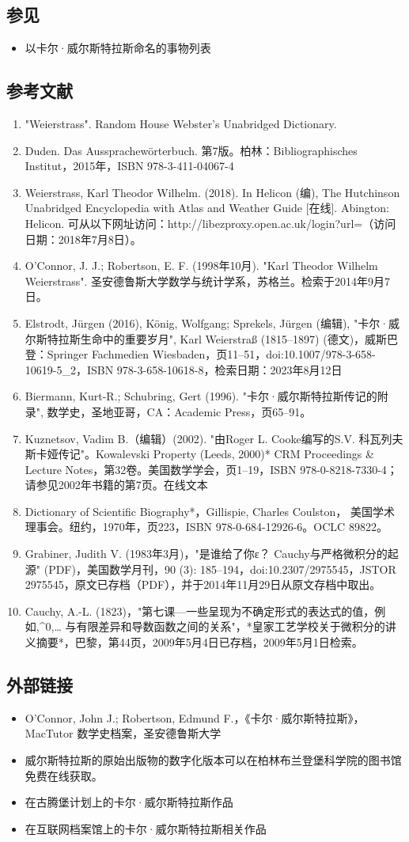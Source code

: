 \subsection{参见}  
\begin{itemize}
\item 以卡尔·威尔斯特拉斯命名的事物列表
\end{itemize}
\subsection{参考文献}  
\begin{enumerate}
\item "Weierstrass". Random House Webster's Unabridged Dictionary.  
\item Duden. Das Aussprachewörterbuch. 第7版。柏林：Bibliographisches Institut，2015年，ISBN 978-3-411-04067-4  
\item Weierstrass, Karl Theodor Wilhelm. (2018). In Helicon (编), The Hutchinson Unabridged Encyclopedia with Atlas and Weather Guide [在线]. Abington: Helicon. 可从以下网址访问：http://libezproxy.open.ac.uk/login?url=（访问日期：2018年7月8日）。  
\item O'Connor, J. J.; Robertson, E. F. (1998年10月). "Karl Theodor Wilhelm Weierstrass". 圣安德鲁斯大学数学与统计学系，苏格兰。检索于2014年9月7日。  
\item Elstrodt, Jürgen (2016), König, Wolfgang; Sprekels, Jürgen (编辑), "卡尔·威尔斯特拉斯生命中的重要岁月", Karl Weierstraß (1815–1897) (德文)，威斯巴登：Springer Fachmedien Wiesbaden，页11–51，doi:10.1007/978-3-658-10619-5_2，ISBN 978-3-658-10618-8，检索日期：2023年8月12日  
\item Biermann, Kurt-R.; Schubring, Gert (1996). "卡尔·威尔斯特拉斯传记的附录", 数学史，圣地亚哥，CA：Academic Press，页65–91。  
\item Kuznetsov, Vadim B.（编辑）(2002). "由Roger L. Cooke编写的S.V. 科瓦列夫斯卡娅传记"。Kowalevski Property (Leeds, 2000)* CRM Proceedings & Lecture Notes，第32卷。美国数学学会，页1–19，ISBN 978-0-8218-7330-4；请参见2002年书籍的第7页。在线文本  
\item Dictionary of Scientific Biography*，Gillispie, Charles Coulston， 美国学术理事会。纽约，1970年，页223，ISBN 978-0-684-12926-6。OCLC 89822。  
\item Grabiner, Judith V. (1983年3月)，"是谁给了你ε？ Cauchy与严格微积分的起源" (PDF)，美国数学月刊，90 (3): 185–194，doi:10.2307/2975545，JSTOR 2975545，原文已存档（PDF），并于2014年11月29日从原文存档中取出。  
\item Cauchy, A.-L. (1823)，"第七课—一些呈现为不确定形式的表达式的值，例如{\displaystyle {\frac {\infty }{\infty }},\infty ^{0},\ldots } 与有限差异和导数函数之间的关系"，*皇家工艺学校关于微积分的讲义摘要*，巴黎，第44页，2009年5月4日已存档，2009年5月1日检索。
\end{enumerate}
\subsection{外部链接}
\begin{itemize}
\item O'Connor, John J.; Robertson, Edmund F.，《卡尔·威尔斯特拉斯》，MacTutor 数学史档案，圣安德鲁斯大学  
\item 威尔斯特拉斯的原始出版物的数字化版本可以在柏林布兰登堡科学院的图书馆免费在线获取。  
\item 在古腾堡计划上的卡尔·威尔斯特拉斯作品  
\item 在互联网档案馆上的卡尔·威尔斯特拉斯相关作品
\end{itemize}